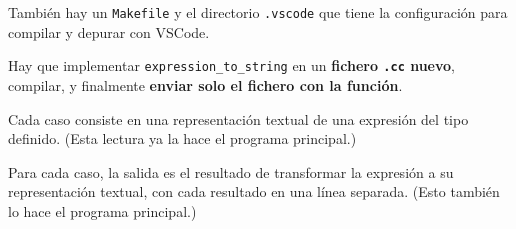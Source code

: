 \medskip

También hay un \verb|Makefile| y el directorio \verb|.vscode| que tiene la configuración para compilar y depurar con VSCode.

\medskip

Hay que implementar \verb|expression_to_string| en un \textbf{fichero \texttt{.cc} nuevo}, compilar, y finalmente \textbf{enviar solo el fichero con la función}.

\Input

Cada caso consiste en una representación textual de una expresión del tipo definido. (Esta lectura ya la hace el programa principal.)

\Output

Para cada caso, la salida es el resultado de transformar la expresión a su representación textual, con cada resultado en una línea separada. (Esto también lo hace el programa principal.)

\SampleTwoCol

